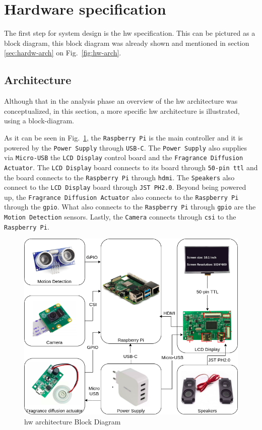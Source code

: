%
\section{Hardware specification}
\label{sec:hw-specs}
The first step for system design is the \gls{hw} specification. This can be pictured as a block diagram, this block diagram was already shown and mentioned in section \ref{sec:hardw-arch} on Fig.~\ref{fig:hw-arch}.

\subsection{Architecture}
\label{sec:arch}
Although that in the analysis phase an overview of the \gls{hw} architecture was conceptualized, in this section, a more specific \gls{hw} architecture is illustrated, using a block-diagram.

As it can be seen in Fig.~\ref{fig:hw-arch-complete}, the \texttt{Raspberry Pi} is the main controller and it is powered by the \texttt{Power Supply} through \texttt{USB-C}. 
The \texttt{Power Supply} also supplies via \texttt{Micro-USB} the \texttt{LCD Display} control board and the \texttt{Fragrance Diffusion Actuator}.
The \texttt{LCD Display} board connects to its board through \texttt{50-pin \gls{ttl}} and the board connects to the \texttt{Raspberry Pi} through \texttt{\gls{hdmi}}.
The \texttt{Speakers} also connect to the \texttt{LCD Display} board through \texttt{JST PH2.0}.
Beyond being powered up, the \texttt{Fragrance Diffusion Actuator} also connects to the \texttt{Raspberry Pi} through the \texttt{\gls{gpio}}.
What also connects to the \texttt{Raspberry Pi} through \texttt{\gls{gpio}} are the \texttt{Motion Detection} sensors.
Lastly, the \texttt{Camera} connects through \texttt{\gls{csi}} to the \texttt{Raspberry Pi}.
%
\begin{figure}[htb!]
\centering
    \includegraphics[width=0.8\columnwidth]{./img/hw-arch-complete.png}
  \caption{\gls{hw} architecture Block Diagram}%
\label{fig:hw-arch-complete}
\end{figure}

